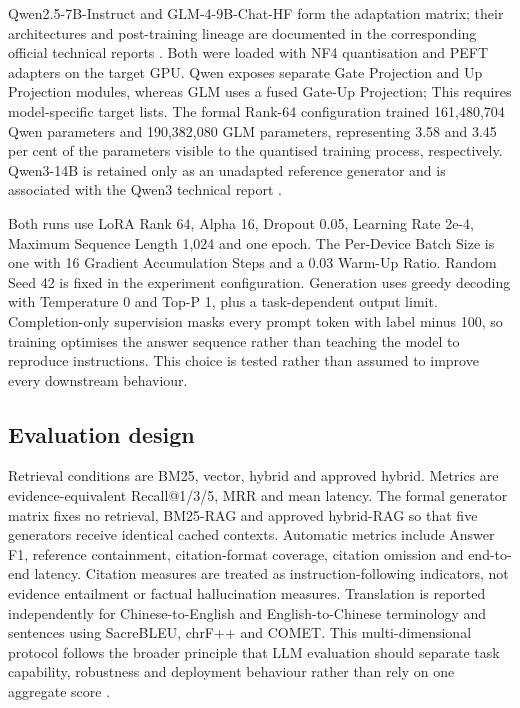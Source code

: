 Qwen2.5-7B-Instruct and GLM-4-9B-Chat-HF form the adaptation matrix; their architectures and post-training lineage are documented in the corresponding official technical reports \citep{qwen2024technical,glm2024chatglm}. Both were loaded with NF4 quantisation and PEFT adapters on the target GPU. Qwen exposes separate Gate Projection and Up Projection modules, whereas GLM uses a fused Gate-Up Projection; This requires model-specific target lists. The formal Rank-64 configuration trained 161,480,704 Qwen parameters and 190,382,080 GLM parameters, representing 3.58 and 3.45 per cent of the parameters visible to the quantised training process, respectively. Qwen3-14B is retained only as an unadapted reference generator and is associated with the Qwen3 technical report \citep{qwen2025technical}.

Both runs use LoRA Rank 64, Alpha 16, Dropout 0.05, Learning Rate 2e-4, Maximum Sequence Length 1,024 and one epoch. The Per-Device Batch Size is one with 16 Gradient Accumulation Steps and a 0.03 Warm-Up Ratio. Random Seed 42 is fixed in the experiment configuration. Generation uses greedy decoding with Temperature 0 and Top-P 1, plus a task-dependent output limit. Completion-only supervision masks every prompt token with label minus 100, so training optimises the answer sequence rather than teaching the model to reproduce instructions. This choice is tested rather than assumed to improve every downstream behaviour.

\subsection{Evaluation design}

Retrieval conditions are BM25, vector, hybrid and approved hybrid. Metrics are evidence-equivalent Recall@1/3/5, MRR and mean latency. The formal generator matrix fixes no retrieval, BM25-RAG and approved hybrid-RAG so that five generators receive identical cached contexts. Automatic metrics include Answer F1, reference containment, citation-format coverage, citation omission and end-to-end latency. Citation measures are treated as instruction-following indicators, not evidence entailment or factual hallucination measures. Translation is reported independently for Chinese-to-English and English-to-Chinese terminology and sentences using SacreBLEU, chrF++ and COMET. This multi-dimensional protocol follows the broader principle that LLM evaluation should separate task capability, robustness and deployment behaviour rather than rely on one aggregate score \citep{chang2024survey}.

